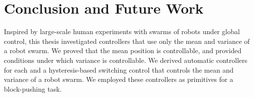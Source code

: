 \chapter[Conclusion]{Conclusion and Future Work}
\label{chap-conc}
    Inspired by large-scale human experiments with swarms of robots under global control,  this thesis investigated controllers that use only the mean and variance of a robot swarm. We proved that the mean position is controllable, and provided conditions under which variance is controllable.  We derived automatic controllers for each and a hysteresis-based switching control that controls the mean and variance of a robot swarm.  We employed these controllers as primitives for a block-pushing task. 
    

